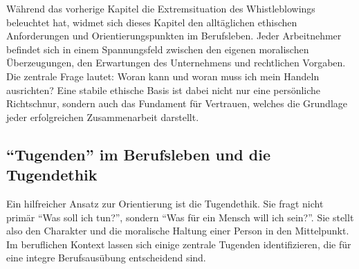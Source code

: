\documentclass[
    12pt,               %
    a4paper,            %
    ngerman             %
]{scrartcl}
\begin{document}

Während das vorherige Kapitel die Extremsituation des Whistleblowings beleuchtet hat, widmet sich dieses Kapitel den alltäglichen ethischen Anforderungen und Orientierungspunkten im Berufsleben. Jeder Arbeitnehmer befindet sich in einem Spannungsfeld zwischen den eigenen moralischen Überzeugungen, den Erwartungen des Unternehmens und rechtlichen Vorgaben. Die zentrale Frage lautet: Woran kann und woran muss ich mein Handeln ausrichten? Eine stabile ethische Basis ist dabei nicht nur eine persönliche Richtschnur, sondern auch das Fundament für Vertrauen, welches die Grundlage jeder erfolgreichen Zusammenarbeit darstellt.

\subsection{\enquote{Tugenden} im Berufsleben und die Tugendethik}
Ein hilfreicher Ansatz zur Orientierung ist die Tugendethik. Sie fragt nicht primär \enquote{Was soll ich tun?}, sondern \enquote{Was für ein Mensch will ich sein?}. Sie stellt also den Charakter und die moralische Haltung einer Person in den Mittelpunkt. Im beruflichen Kontext lassen sich einige zentrale Tugenden identifizieren, die für eine integre Berufsausübung entscheidend sind.
\end{document}
